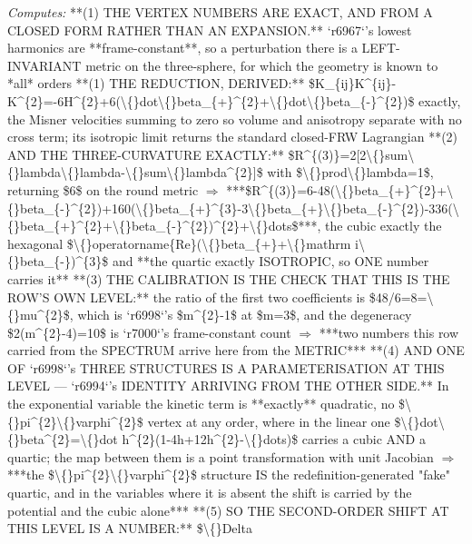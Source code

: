 \begin{description}
\emph{Computes:} **(1) THE VERTEX NUMBERS ARE EXACT, AND FROM A CLOSED FORM RATHER THAN AN EXPANSION.** `r6967`'s lowest harmonics are **frame-constant**, so a perturbation there is a LEFT-INVARIANT metric on the three-sphere, for which the geometry is known to *all* orders  **(1) THE REDUCTION, DERIVED:** \$K\_\{ij\}K\textasciicircum{}\{ij\}-K\textasciicircum{}\{2\}=-6H\textasciicircum{}\{2\}+6(\textbackslash\{\}dot\textbackslash\{\}beta\_\{+\}\textasciicircum{}\{2\}+\textbackslash\{\}dot\textbackslash\{\}beta\_\{-\}\textasciicircum{}\{2\})\$ exactly, the Misner velocities summing to zero so volume and anisotropy separate with no cross term; its isotropic limit returns the standard closed-FRW Lagrangian  **(2) AND THE THREE-CURVATURE EXACTLY:** \$R\textasciicircum{}\{(3)\}=2[2\textbackslash\{\}sum\textbackslash\{\}lambda\textbackslash\{\}lambda-\textbackslash\{\}sum\textbackslash\{\}lambda\textasciicircum{}\{2\}]\$ with \$\textbackslash\{\}prod\textbackslash\{\}lambda=1\$, returning \$6\$ on the round metric \ensuremath{\Rightarrow} ***\$R\textasciicircum{}\{(3)\}=6-48(\textbackslash\{\}beta\_\{+\}\textasciicircum{}\{2\}+\textbackslash\{\}beta\_\{-\}\textasciicircum{}\{2\})+160(\textbackslash\{\}beta\_\{+\}\textasciicircum{}\{3\}-3\textbackslash\{\}beta\_\{+\}\textbackslash\{\}beta\_\{-\}\textasciicircum{}\{2\})-336(\textbackslash\{\}beta\_\{+\}\textasciicircum{}\{2\}+\textbackslash\{\}beta\_\{-\}\textasciicircum{}\{2\})\textasciicircum{}\{2\}+\textbackslash\{\}dots\$***, the cubic exactly the hexagonal \$\textbackslash\{\}operatorname\{Re\}(\textbackslash\{\}beta\_\{+\}+\textbackslash\{\}mathrm i\textbackslash\{\}beta\_\{-\})\textasciicircum{}\{3\}\$ and **the quartic exactly ISOTROPIC, so ONE number carries it**  **(3)  THE CALIBRATION IS THE CHECK THAT THIS IS THE ROW'S OWN LEVEL:** the ratio of the first two coefficients is \$48/6=8=\textbackslash\{\}mu\textasciicircum{}\{2\}\$, which is `r6998`'s \$m\textasciicircum{}\{2\}-1\$ at \$m=3\$, and the degeneracy \$2(m\textasciicircum{}\{2\}-4)=10\$ is `r7000`'s frame-constant count \ensuremath{\Rightarrow} ***two numbers this row carried from the SPECTRUM arrive here from the METRIC***  **(4)  AND ONE OF `r6998`'s THREE STRUCTURES IS A PARAMETERISATION AT THIS LEVEL --- `r6994`'s IDENTITY ARRIVING FROM THE OTHER SIDE.** In the exponential variable the kinetic term is **exactly** quadratic, no \$\textbackslash\{\}pi\textasciicircum{}\{2\}\textbackslash\{\}varphi\textasciicircum{}\{2\}\$ vertex at any order, where in the linear one \$\textbackslash\{\}dot\textbackslash\{\}beta\textasciicircum{}\{2\}=\textbackslash\{\}dot h\textasciicircum{}\{2\}(1-4h+12h\textasciicircum{}\{2\}-\textbackslash\{\}dots)\$ carries a cubic AND a quartic; the map between them is a point transformation with unit Jacobian \ensuremath{\Rightarrow} ***the \$\textbackslash\{\}pi\textasciicircum{}\{2\}\textbackslash\{\}varphi\textasciicircum{}\{2\}\$ structure IS the redefinition-generated "fake" quartic, and in the variables where it is absent the shift is carried by the potential and the cubic alone***  **(5)  SO THE SECOND-ORDER SHIFT AT THIS LEVEL IS A NUMBER:** \$\textbackslash\{\}Delta 
\end{description}
